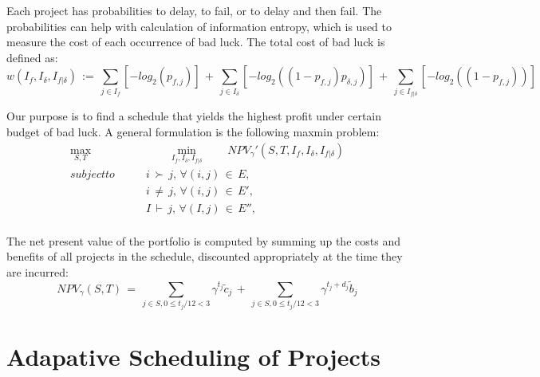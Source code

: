 \documentclass[final,3p,times]{elsarticle}
\begin{document}
	Each project has probabilities to delay, to fail, or to delay and then fail. The probabilities can help with calculation of information entropy, which is used to measure the cost of each occurrence of bad luck. The total cost of bad luck is defined as:
	\begin{equation*}
		w(I_f, I_{\delta}, I_{f|\delta})\,:=\,\sum_{j\in I_f} [-log_2(p_{f,j})]\,+\,\sum_{j\in I_{\delta}}[-log_2((1-p_{f,j})p_{\delta,j})]\,+\,\sum_{j\in I_{f|\delta}}[-log_2((1-p_{f,j}))]
	\end{equation*}
	
	Our purpose is to find a schedule that yields the highest profit under certain budget of bad luck. A general formulation is the following maxmin problem:
	\begin{equation}\label{SecondOrProblem}
		\begin{aligned}
			\max_{S,T}&\qquad\min_{I_f, I_{\delta}, I_{f|\delta}}\qquad NPV_{\gamma}'(S,T,I_f, I_{\delta}, I_{f|\delta})\\
			subject to \qquad & i\,\succ\,j,\,\forall (i,j)\,\in\,E,\\
			& i \,\neq \,j, \,\forall (i,j)\,\in\,E',\\
			& I \,\vdash \,j, \,\forall (I,j)\,\in\,E'',\\
		\end{aligned}
	\end{equation}
	
	The net present value of the portfolio is computed by summing up the costs and benefits of all projects in the schedule, discounted appropriately at the time they are incurred:
	\begin{equation}
		NPV_{\gamma}(S,T)\,=\,\sum_{j\in S, 0\leq t_j/12<3} \gamma^{t_j} \tilde{c}_j\,+\,\sum_{j\in S, 0\leq t_j/12<3} \gamma^{t_j+d_j} \tilde{b}_j
	\end{equation}

\section{Adapative Scheduling of Projects}
\end{document}
